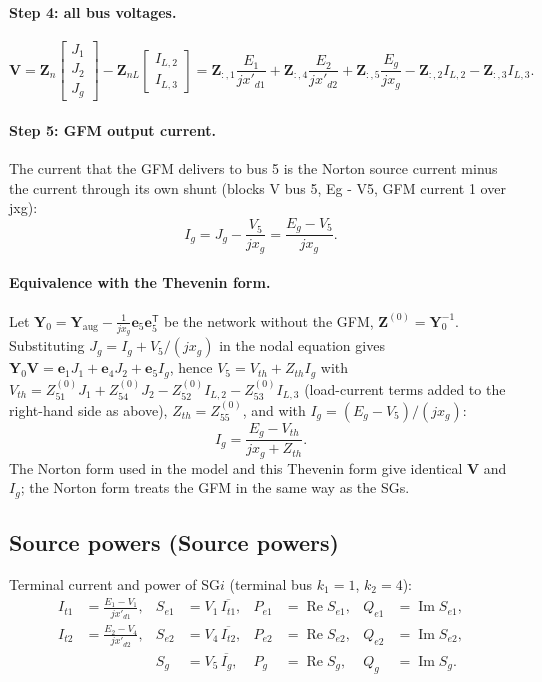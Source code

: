 \documentclass[11pt,a4paper]{article}
\numberwithin{equation}{section}
\newcommand{\cj}[1]{\overline{#1}}
\newcommand{\re}{\operatorname{Re}}
\newcommand{\im}{\operatorname{Im}}
\newcommand{\blk}[1]{\textsf{#1}}
\begin{document}
\paragraph{Step 4: all bus voltages.}
\begin{equation}
\boxed{\bm V = \bm Z_n\begin{bmatrix}J_1\\ J_2\\ J_g\end{bmatrix} - \bm Z_{nL}\begin{bmatrix}I_{L,2}\\ I_{L,3}\end{bmatrix}
= \bm Z_{:,1}\frac{E_1}{jx'_{d1}} + \bm Z_{:,4}\frac{E_2}{jx'_{d2}} + \bm Z_{:,5}\frac{E_g}{jx_g} - \bm Z_{:,2}I_{L,2} - \bm Z_{:,3}I_{L,3}.}
\end{equation}

\paragraph{Step 5: GFM output current.}
The current that the GFM delivers to bus 5 is the Norton source current minus the current through its own shunt (blocks \blk{V bus 5}, \blk{Eg - V5}, \blk{GFM current 1 over jxg}):
\begin{equation}
\boxed{I_g = J_g - \frac{V_5}{jx_g} = \frac{E_g - V_5}{jx_g}.}
\end{equation}

\paragraph{Equivalence with the Thevenin form.}
Let $\bm Y_0 = \bm Y_{\text{aug}} - \tfrac{1}{jx_g}\bm e_5\bm e_5^{\mathsf T}$ be the network without the GFM, $\bm Z^{(0)} = \bm Y_0^{-1}$. Substituting $J_g = I_g + V_5/(jx_g)$ in the nodal equation gives $\bm Y_0\bm V = \bm e_1J_1+\bm e_4J_2+\bm e_5I_g$, hence $V_5 = V_{th} + Z_{th}I_g$ with $V_{th} = Z^{(0)}_{51}J_1 + Z^{(0)}_{54}J_2 - Z^{(0)}_{52}I_{L,2} - Z^{(0)}_{53}I_{L,3}$ (load-current terms added to the right-hand side as above), $Z_{th} = Z^{(0)}_{55}$, and with $I_g = (E_g - V_5)/(jx_g)$:
\begin{equation}
I_g = \frac{E_g - V_{th}}{jx_g + Z_{th}} .
\end{equation}
The Norton form used in the model and this Thevenin form give identical $\bm V$ and $I_g$; the Norton form treats the GFM in the same way as the SGs.

\subsection{Source powers (\blk{Source powers})}
Terminal current and power of SG$i$ (terminal bus $k_1=1$, $k_2=4$):
\begin{align}
I_{t1} &= \frac{E_1 - V_1}{jx'_{d1}}, & S_{e1} &= V_1\,\cj{I_{t1}}, & P_{e1}&=\re S_{e1}, & Q_{e1}&=\im S_{e1},\\
I_{t2} &= \frac{E_2 - V_4}{jx'_{d2}}, & S_{e2} &= V_4\,\cj{I_{t2}}, & P_{e2}&=\re S_{e2}, & Q_{e2}&=\im S_{e2},\\
       &                           & S_{g} &= V_5\,\cj{I_g},    & P_{g}&=\re S_{g}, & Q_{g}&=\im S_{g}.
\end{align}
\end{document}
